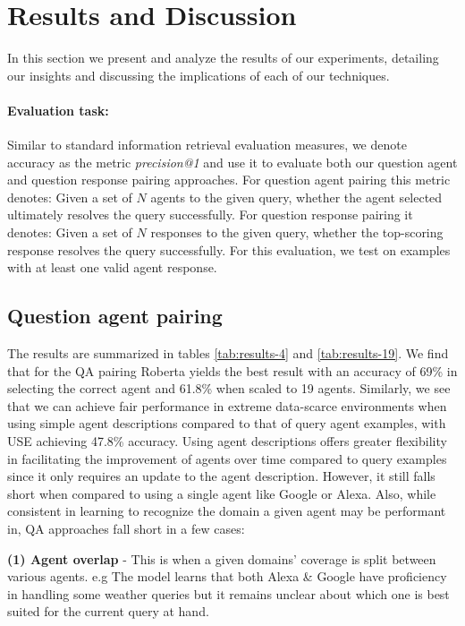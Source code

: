 \documentclass[11pt]{article}
\begin{document}
\section{Results and Discussion}

In this section we present and analyze the results of our experiments, detailing our insights and discussing the implications of each of our techniques. 

\paragraph{Evaluation task:} Similar to standard information retrieval evaluation measures, we denote accuracy as the metric \emph{precision@1} and use it to evaluate both our question agent and question response pairing approaches. For question agent pairing this metric denotes: Given a set of $N$ agents to the given query, whether the agent selected ultimately resolves the query successfully. For question response pairing it denotes: Given a set of $N$ responses to the given query, whether the top-scoring response resolves the query successfully. For this evaluation, we test on examples with at least one valid agent response.

\subsection{Question agent pairing} The results are summarized in tables \ref{tab:results-4} and \ref{tab:results-19}. We find that for the QA pairing Roberta yields the best result with an accuracy of 69\% in selecting the correct agent and 61.8\% when scaled to 19 agents. Similarly, we see that we can achieve fair performance in extreme data-scarce environments when using simple agent descriptions compared to that of query agent examples, with USE achieving 47.8\% accuracy. Using agent descriptions offers greater flexibility in facilitating the improvement of agents over time compared to query examples since it only requires an update to the agent description. However, it still falls short when compared to using a single agent like Google or Alexa. Also, while consistent in learning to recognize the domain a given agent may be performant in, QA approaches fall short in a few cases: 

\textbf{(1) Agent overlap} - This is when a given domains' coverage is split between various agents. e.g The model learns that both Alexa \& Google have proficiency in handling some weather queries but it remains unclear about which one is best suited for the current query at hand. 
\end{document}
